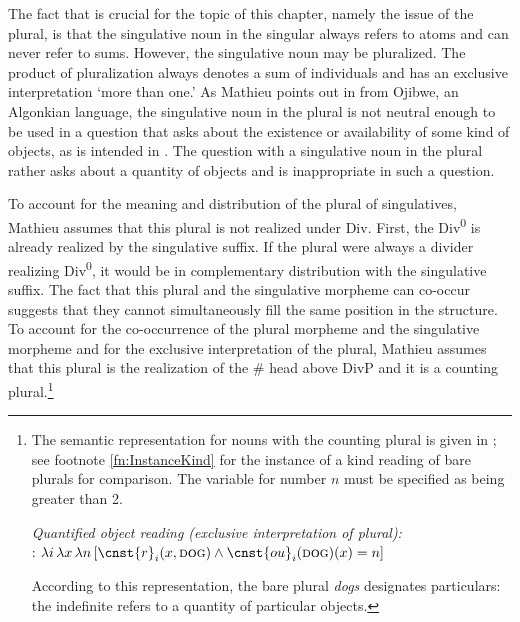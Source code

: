 \documentclass[output=paper,colorlinks,citecolor=brown]{langscibook}
\begin{document}
The fact that is crucial for the topic of this chapter, namely the issue of the plural, is that the singulative noun in the singular always refers to atoms and can never refer to sums. However, the singulative noun may be pluralized. The product of pluralization always denotes a sum of individuals and has an exclusive interpretation `more than one.' As Mathieu points out in  from Ojibwe, an Algonkian language, the singulative noun in the plural is not neutral enough to be used in a question that asks about the existence or availability of some kind of objects, as is intended in . The question with a singulative noun in the plural rather asks about a quantity of objects and is inappropriate in such a question.

\label{ex:geist:23}
\z
	   
\noindent To account for the meaning and distribution of the plural of singulatives, Mathieu assumes that this plural is not realized under Div. First, the Div\textsuperscript{0} is already realized by the singulative suffix. If the plural were always a divider realizing Div\textsuperscript{0}, it would be in complementary distribution with the singulative suffix. The fact that this plural and the singulative morpheme can co-occur suggests that they cannot simultaneously fill the same position in the structure. To account for the co-occurrence of the plural morpheme and the singulative morpheme and for the exclusive interpretation of the plural, Mathieu assumes that this plural is the realization of the \# head above DivP and it is a counting plural.\footnote{The semantic representation for nouns with the counting plural is given in ; see footnote \ref{fn:InstanceKind} for the instance of a kind reading of bare plurals for comparison. The variable for number $n$ must be specified as being greater than 2.

\ea \textit{Quantified object reading {(}exclusive interpretation of plural{)}:}\\
: $\lambda i \, \lambda x \, \lambda n \, [ \cnst{r}_i (x, \textsc{dog}) \wedge \cnst{ou}_i (\textsc{dog})(x) = n ]$  \hfill \citep[7]{Grimm2013} 
\label{ex:geist:QuantObj}
\z

\noindent According to this representation, the bare plural \textit{dogs} designates particulars: the indefinite refers to a quantity of particular objects.} 
\end{document}
